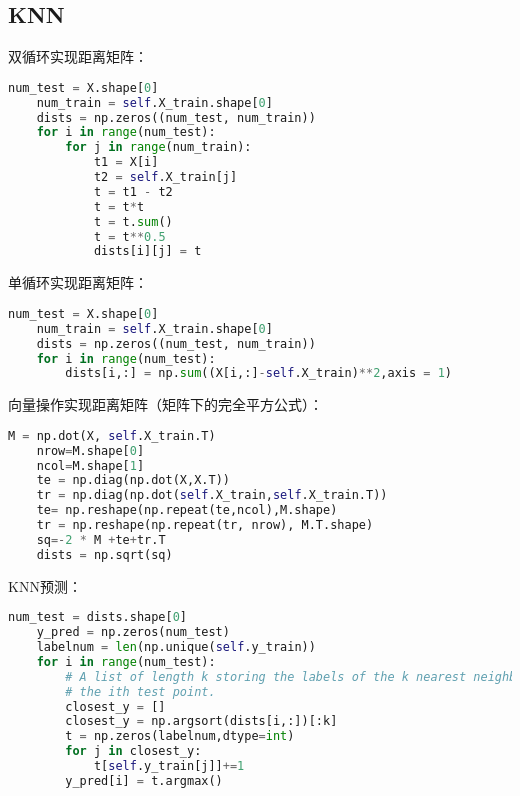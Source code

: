 \documentclass[a4paper]{article}
\begin{document}
\subsection{KNN}
双循环实现距离矩阵：
\begin{lstlisting}[language=Python, caption=KNN双循环实现距离矩阵]
    num_test = X.shape[0]
    num_train = self.X_train.shape[0]
    dists = np.zeros((num_test, num_train))
    for i in range(num_test):
        for j in range(num_train):
            t1 = X[i]
            t2 = self.X_train[j]
            t = t1 - t2
            t = t*t
            t = t.sum()
            t = t**0.5
            dists[i][j] = t
\end{lstlisting}
单循环实现距离矩阵：
\begin{lstlisting}[language=Python, caption=KNN单循环实现距离矩阵]
    num_test = X.shape[0]
    num_train = self.X_train.shape[0]
    dists = np.zeros((num_test, num_train))
    for i in range(num_test):
        dists[i,:] = np.sum((X[i,:]-self.X_train)**2,axis = 1)
\end{lstlisting}
向量操作实现距离矩阵（矩阵下的完全平方公式）：
\begin{lstlisting}[language=Python, caption=KNN向量操作实现距离矩阵]
    M = np.dot(X, self.X_train.T)
    nrow=M.shape[0]
    ncol=M.shape[1]
    te = np.diag(np.dot(X,X.T))
    tr = np.diag(np.dot(self.X_train,self.X_train.T))
    te= np.reshape(np.repeat(te,ncol),M.shape)
    tr = np.reshape(np.repeat(tr, nrow), M.T.shape)
    sq=-2 * M +te+tr.T
    dists = np.sqrt(sq)
\end{lstlisting}
KNN预测：
\begin{lstlisting}[language=Python, caption=KNN预测]
    num_test = dists.shape[0]
    y_pred = np.zeros(num_test)
    labelnum = len(np.unique(self.y_train))
    for i in range(num_test):
        # A list of length k storing the labels of the k nearest neighbors to
        # the ith test point.
        closest_y = []
        closest_y = np.argsort(dists[i,:])[:k]
        t = np.zeros(labelnum,dtype=int)
        for j in closest_y:
            t[self.y_train[j]]+=1
        y_pred[i] = t.argmax()
\end{lstlisting}
\end{document}
